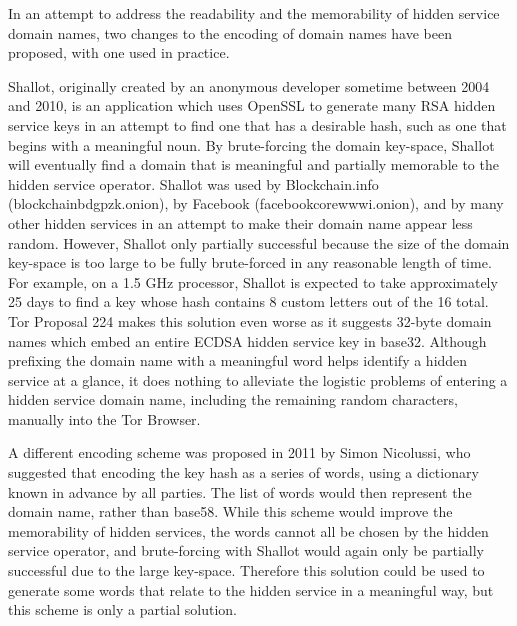 In an attempt to address the readability and the memorability of hidden service domain names, two changes to the encoding of domain names have been proposed, with one used in practice.

Shallot, originally created by an anonymous developer sometime between 2004 and 2010, is an application which uses OpenSSL to generate many RSA hidden service keys in an attempt to find one that has a desirable hash, such as one that begins with a meaningful noun.\cite{KatmagicShallot} By brute-forcing the domain key-space, Shallot will eventually find a domain that is meaningful and partially memorable to the hidden service operator. Shallot was used by Blockchain.info (blockchainbdgpzk.onion), by Facebook (facebookcorewwwi.onion), and by many other hidden services in an attempt to make their domain name appear less random. However, Shallot only partially successful because the size of the domain key-space is too large to be fully brute-forced in any reasonable length of time. For example, on a 1.5 GHz processor, Shallot is expected to take approximately 25 days to find a key whose hash contains 8 custom letters out of the 16 total.\cite{KatmagicShallot} Tor Proposal 224 makes this solution even worse as it suggests 32-byte domain names which embed an entire ECDSA hidden service key in base32.\cite{Proposal224} Although prefixing the domain name with a meaningful word helps identify a hidden service at a glance, it does nothing to alleviate the logistic problems of entering a hidden service domain name, including the remaining random characters, manually into the Tor Browser.

A different encoding scheme was proposed in 2011 by Simon Nicolussi, who suggested that encoding the key hash as a series of words, using a dictionary known in advance by all parties. The list of words would then represent the domain name, rather than base58. While this scheme would improve the memorability of hidden services, the words cannot all be chosen by the hidden service operator, and brute-forcing with Shallot would again only be partially successful due to the large key-space. Therefore this solution could be used to generate some words that relate to the hidden service in a meaningful way, but this scheme is only a partial solution.\cite{nicolussi2011human}

